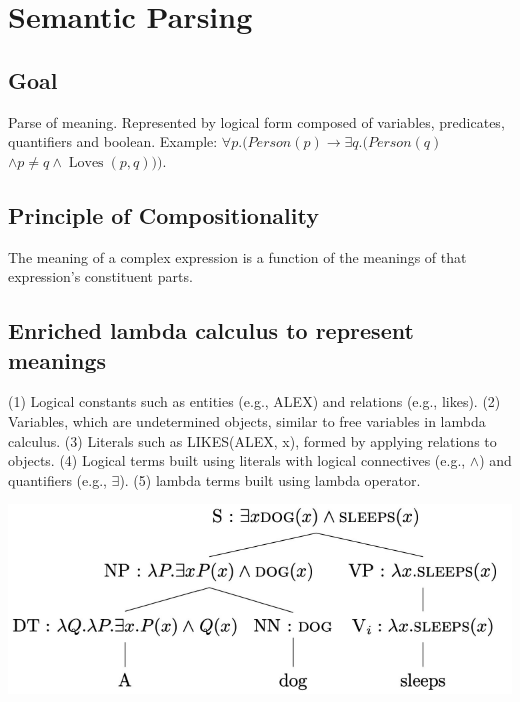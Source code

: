 \section{Semantic Parsing}

\subsection*{Goal}
Parse of meaning. Represented by logical form composed of variables, predicates, quantifiers and boolean. Example: $\forall p .(P e r s o n(p) \rightarrow \exists q .(P e r s o n(q)$
$\wedge p \neq q \wedge \operatorname{Loves}(p, q)))$.

\subsection*{Principle of Compositionality}
The meaning of a complex expression is a function of
the meanings of that expression's constituent parts.

\subsection*{Enriched lambda calculus to represent meanings}

(1) Logical constants such as entities (e.g., ALEX) and relations (e.g., likes). 
(2) Variables, which are undetermined objects, similar to free variables in lambda calculus.
(3) Literals such as LIKES(ALEX, x), formed by applying relations to objects.
(4) Logical terms built using literals with logical connectives (e.g., $\land$) and quantifiers (e.g., $\exists$).
(5) lambda terms built using lambda operator.

\begin{center}
    \includegraphics[width=\columnwidth]{img/semantic_representation.png}
\end{center}
